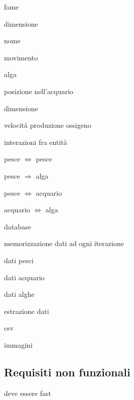 \documentclass[12pt,a4paper,oneside,article]{article}
\begin{document}
\begin{legal}[label*=3.\arabic*.]
\begin{legal}
\begin{legal}
\begin{legal}
    				\item fame
    				\item dimensione
    				\item nome
    			\end{legal}
    			\item movimento
    		\end{legal}
    		\item alga
    		\begin{legal}
    			\item posizione nell'acquario
    			\item dimensione
    			\item velocità produzione ossigeno
    		\end{legal}
    		\item interazioni fra entità
    		\begin{legal}
    			\item pesce $\iff$ pesce
    			\item pesce $\Rightarrow$ alga
    			\item pesce $\iff$ acquario
    			\item acquario $\iff$ alga
    		\end{legal}
    	\end{legal}
    	\item database
    	\begin{legal}
    		\item memorizzazione dati ad ogni iterazione
    		\begin{legal}
    			\item dati pesci
    			\item dati acquario
    			\item dati alghe
    		\end{legal}
    		\item estrazione dati
    		\begin{legal}
    			\item csv
    			\item immagini
    		\end{legal}
    	\end{legal}
    \end{legal}

	\subsection{Requisiti non funzionali}
	\begin{legal}[label*=4.\arabic*.]
		\item deve essere fast
	\end{legal}
    
\end{document}
